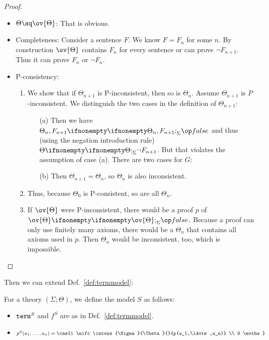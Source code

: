 \begin{proof}
\begin{itemize}
\item $\Theta\sq\ov{\Theta}$: That is obvious.
\item Completeness: Consider a sentence $F$. We know $F=F_n$ for some $n$. By construction $\ov{\Theta}$ contains $F_n$ for every sentence or can prove $\neg F_{n+1}$.
Thus it can prove $F_n$ or $\neg F_n$.
\item P-consistency:
\begin{enumerate}
  \item We show that if $\Theta_{n+1}$ is P-inconsistent, then so is $\Theta_n$.
  Assume $\Theta_{n+1}$ is $P$-inconsistent.
        We distinguish the two cases in the definition of $\Theta_{n+1}$:
        \begin{itemize}
          \item[(a)] Then we have $\iscons{\Sigma}{\Theta_n,F_{n+1}}{}{\false}$ and thus (using the negation introduction rule) $\iscons{\Sigma}{\Theta}{}{\neg F_{n+1}}$. But that violates the assumption of case (a).
        There are two cases for $G$:
          \item[(b)] Then $\Theta_{n+1}=\Theta_n$, so $\Theta_n$ is also inconsistent.
        \end{itemize}
     \item Thus, because $\Theta_0$ is P-consistent, so are all $\Theta_n$.
     \item If $\ov{\Theta}$ were P-inconsistent, there would be a proof $p$ of $\iscons{\Sigma}{\ov{\Theta}}{}{\false}$.
       Because a proof can only use finitely many axioms, there would be a $\Theta_n$ that contains all axioms used in $p$.
       Then $\Theta_n$ would be inconsistent, too, which is impossible.
   \end{enumerate}
\end{itemize}
\end{proof}

Then we can extend Def.~\ref{def:termmodel}:

\begin{definition}\label{def:termmodel2}
For a theory $(\Sigma;\Theta)$, we define the model $S$ as follows:
 \begin{itemize}
  \item $\mathtt{term}^S$ and $f^S$ are as in Def.~\ref{def:termmodel}.
  \item $p^S(u_1,\ldots,u_n)=\cas{1 \mifc \iscons{\Sigma}{\Theta}{}{p(u_1,\ldots,u_n)} \\
                                  0 \mothw}$
 \end{itemize}
\end{definition}

